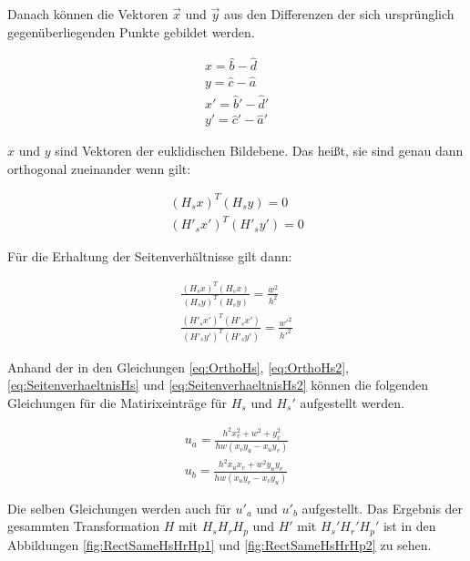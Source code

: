 Danach können die Vektoren $\vec{x}$ und $\vec{y}$ aus den Differenzen der sich ursprünglich gegenüberliegenden Punkte gebildet werden.

\begin{gather}
	x = \hat{b}-\hat{d}\\
	y = \hat{c}-\hat{a}\\
	x' = \hat{b}'-\hat{d}'\\
	y' = \hat{c}'-\hat{a}'
\end{gather}

$x$ und $y$ sind Vektoren der euklidischen Bildebene\cite{ZZ}. Das heißt, sie sind genau dann orthogonal zueinander wenn gilt:

\begin{gather}
	(H_sx)^T(H_sy)= 0 \label{eq:OrthoHs}\\
	(H'_sx')^T(H'_sy')= 0 \label{eq:OrthoHs2}
\end{gather}

Für die Erhaltung der Seitenverhältnisse gilt dann:

\begin{gather}
	\frac{(H_sx)^T(H_sx)}{(H_sy)^T(H_sy)} = \frac{w^2}{h^2} \label{eq:SeitenverhaeltnisHs}\\
	\frac{(H'_sx')^T(H'_sx')}{(H'_sy')^T(H'_sy')} = \frac{w'^2}{h'^2}\label{eq:SeitenverhaeltnisHs2}	
\end{gather}

Anhand der in den Gleichungen \ref{eq:OrthoHs}, \ref{eq:OrthoHs2}, \ref{eq:SeitenverhaeltnisHs} und \ref{eq:SeitenverhaeltnisHs2} können die folgenden Gleichungen für die Matirixeinträge für $H_s$ und $H_s'$ aufgestellt werden\cite{ZZ,ACM}.


\begin{gather}
u_a = \frac{h^2x_v^2+w^2+y_v^2}{hw(x_vy_u-x_uy_v)}\\
u_b = \frac{h^2x_ux_v+w^2y_uy_v}{hw(x_uy_v-x_vy_u)}
\end{gather}


Die selben Gleichungen werden auch für $u'_a$ und $u'_b$ aufgestellt. Das Ergebnis der gesammten Transformation $H$ mit $H_sH_rH_p$ und $H'$ mit $H_s'H_r'H_p'$ ist in den Abbildungen \ref{fig:RectSameHsHrHp1} und \ref{fig:RectSameHsHrHp2} zu sehen.\\

